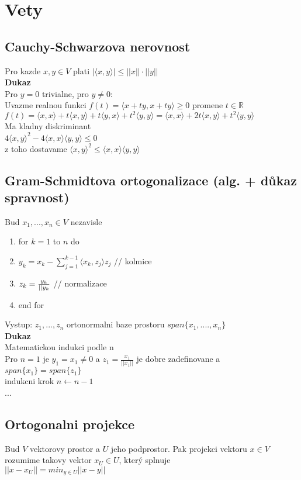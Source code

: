 \documentclass[a4paper]{article}
\begin{document}
\section*{Vety}
\subsection*{Cauchy-Schwarzova nerovnost}
Pro kazde $x,y \in V$ plati $|\langle x,y \rangle| \leq ||x|| \cdot ||y||$
\\
\textbf{Dukaz}\\
Pro $y=0$ trivialne, pro $y\neq0$:\\
Uvazme realnou funkci $f(t)=\langle x+ty,x+ty \rangle \geq 0$ promene $t\in\mathbb{R}$\\
$f(t)=\langle x,x \rangle + t\langle x,y \rangle + t\langle y,x \rangle + t^2\langle y,y \rangle=
\langle x,x \rangle + 2t \langle x,y \rangle + t^2 \langle y,y \rangle$\\
Ma kladny diskriminant\\
$4\langle x,y \rangle^2 - 4\langle x,x \rangle\langle y,y \rangle \leq 0$\\
z toho dostavame
$\langle x,y \rangle^2\leq\langle x,x \rangle\langle y,y \rangle$


\subsection*{Gram-Schmidtova ortogonalizace (alg. + důkaz spravnost)}
Bud $x_1, ..., x_n \in V$ nezavisle\\
\begin{enumerate}
	\item for $k=1$ to $n$ do
	\item $y_k = x_k - \sum_{j=1}^{k-1}\langle x_k,z_j \rangle z_j$ // kolmice
	\item $z_k = \frac{y_k}{||y_k\\}$ // normalizace
	\item end for
\end{enumerate}
Vystup: $z_1, ...,z_n$ ortonormalni baze prostoru $span\{x_1, ...., x_n\}$\\
\textbf{Dukaz}\\
Matematickou indukci podle n\\
Pro $n=1$ je $y_1=x_1\neq 0$ a $z_1 = \frac{x_1}{||x_1||}$ je 
dobre zadefinovane a $span\{x_1\} = span\{z_1\}$\\
indukcni krok $n \gets n-1$\\
...


\subsection*{Ortogonalni projekce}
Bud $V$ vektorovy prostor a $U$ jeho podprostor.
Pak projekci vektoru $x \in V$ rozumime takovy vektor $x_U \in U$,
který splnuje\\
$||x - x_U|| = min_{y\in U} ||x - y||$
\end{document}
